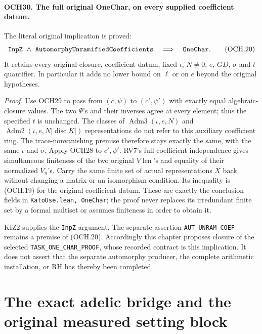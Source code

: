 \documentclass[11pt,a4paper]{article}
\numberwithin{equation}{section}
\theoremstyle{remark}\newtheorem{remark}[theorem]{Remark}
\begin{document}
\paragraph{OCH30. The full original OneChar, on every supplied coefficient datum.}
\label{claim:OCH30}
The literal original implication is proved:
\[
       \texttt{Inp\allowbreak Z}\ \wedge\
       \texttt{Automorphy\allowbreak Unramified\allowbreak Coefficients}
                    \quad\Longrightarrow\quad\texttt{One\allowbreak Char}.
 \tag{OCH.20}
\]
It retains every original closure, coefficient datum, fixed
\(\iota\), \(N\ne0\), \(e\), \(GD\),
\(\sigma\) and \(t\) quantifier.  In particular it adds
no lower bound on \(\ell\) or on \(e\) beyond the original
hypotheses.

\emph{Proof.}
Use OCH29 to pass from \((c,\psi)\) to
\((c',\psi')\) with exactly equal algebraic-closure values.
The two \(\Psi\)'s and their inverses agree at every element;
thus the specified \(t\) is unchanged.  The classes of
\(\operatorname{Adm3}(\iota,e,N)\) and
\(\operatorname{Adm2}(\iota,e,N|\operatorname{disc}K|)\)
representations do not refer to this auxiliary coefficient ring.
The trace-nonvanishing premise therefore stays exactly the same,
with the same \(\iota\) and \(\sigma\).
Apply OCH28 to \(c',\psi'\).  RV7's full coefficient
independence gives simultaneous finiteness of the two original
\(V\!\operatorname{len}\)'s and equality of their normalized
\(V_n\)'s.  Carry the same finite set of actual representations
\(X\) back without changing a matrix or an isomorphism condition.
Its inequality is (OCH.19) for the original coefficient datum.
These are exactly the conclusion fields in
\texttt{Kato\allowbreak Use.\allowbreak lean, One\allowbreak Char}; the proof never replaces its
irredundant finite set by a formal multiset or assumes finiteness
in order to obtain it.

KIZ2 supplies the \texttt{Inp\allowbreak Z} argument.  The separate assertion
\texttt{AUT\_\allowbreak UNRAM\_\allowbreak COEF} remains a premise of (OCH.20).
Accordingly this chapter proposes closure of the selected
\texttt{TASK\_\allowbreak ONE\_\allowbreak CHAR\_\allowbreak PROOF}, whose recorded contract is
this implication.  It does not assert that the separate automorphy
producer, the complete arithmetic installation, or RH has thereby
been completed.


\section{The exact adelic bridge and the original measured setting block}
\label{sec:adelic-measures-v48}
\end{document}
